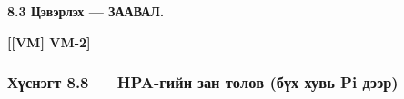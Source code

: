 \textbf{8.3 Цэвэрлэх --- ЗААВАЛ.}

\textbf{{[}{[}VM{]} VM-2{]}}

\begin{Shaded}
\begin{Highlighting}[]
\OperatorTok{2\textgreater{}}
\end{Highlighting}
\end{Shaded}

\hypertarget{ux445ux4afux441ux43dux44dux433ux442-8.8-hpa-ux433ux438ux439ux43d-ux437ux430ux43d-ux442ux4e9ux43bux4e9ux432-ux431ux4afux445-ux445ux443ux432ux44c-pi-ux434ux44dux44dux440}{%
\subsubsection{Хүснэгт 8.8 --- HPA-гийн зан төлөв (бүх хувь Pi дээр)}\label{ux445ux4afux441ux43dux44dux433ux442-8.8-hpa-ux433ux438ux439ux43d-ux437ux430ux43d-ux442ux4e9ux43bux4e9ux432-ux431ux4afux445-ux445ux443ux432ux44c-pi-ux434ux44dux44dux440}}

